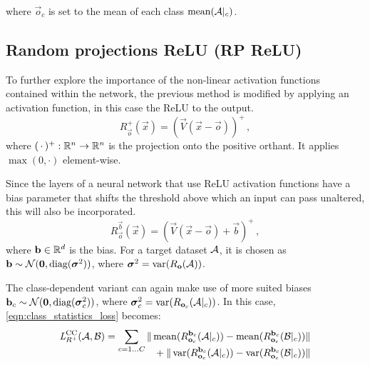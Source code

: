 %
where $\vec o_c$ is set to the mean of each class $\mean ({\set A|_c})$.


\subsection{Random projections ReLU (RP ReLU)}
To further explore the importance of the non-linear activation functions contained within the network,
the previous method is modified by applying an activation function, in this case the ReLU to the output.
% 
\[
    R_{\vec o}^+ (\vec x) = (\vec V (\vec x - \vec o))^+ \,,
\]
where $(\,\cdot\,)^+ :\R^n \to \R^n$ is the projection onto the positive orthant. It applies $\max(0, \cdot)$ element-wise.

Since the layers of a neural network that use ReLU activation functions have a bias parameter that shifts the threshold above which an input can pass unaltered, this will also be incorporated.
\[
    R_{\vec o}^{\vec b} (\vec x) = (\vec V (\vec x - \vec o) + \vec b)^+ \,,
\]
where $\vec b \in \R^d$ is the bias. For a target dataset $\set A$, it is chosen as $\vec b \sim \mathcal N(\vec 0, \textnormal{diag}(\boldsymbol \sigma ^2))$, 
where $\boldsymbol \sigma ^2 = \var ({R_{\vec o}(\set A)})$.

The class-dependent variant can again make use of more suited biases $\vec b_c \sim \mathcal N( \vec 0, \textnormal{diag}(\boldsymbol \sigma _c^2))$, 
where $\boldsymbol \sigma_c ^2 = \var ({R_{\vec o_c}(\set A|_c)})$.
In this case, \cref{eqn:class_statistics_loss} becomes:
% 
\begin{equation*}
    \loss _{R^+} ^\text{CC} (\set A, \set B) =
    \sum _{c = 1 \dots C}
    \begin{alignedat}[t]{1}
        \|\mean ({R_{\vec o_c}^{\vec b_c} (\set A|_c)}) - \mean ({R_{\vec o_c}^{\vec b_c} (\set B|_c)}) &\| \\
        {} + \|\var ({R_{\vec o_c}^{\vec b_c} (\set A|_c)}) - \var ({R_{\vec o_c}^{\vec b_c} (\set B|_c)}) &\| 
    \end{alignedat}
\end{equation*}

